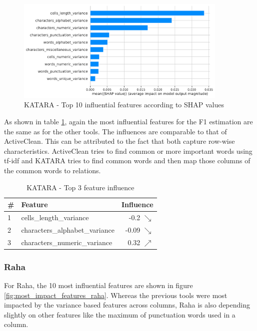 \begin{figure}[H]
    \centering
    \includegraphics[width=0.9\textwidth]{thesis/Figures/RQ4/Shap_KATARA.pdf}
    \caption{KATARA - Top 10 influential features according to SHAP values}
    \label{fig:most_impact_features_katara}
\end{figure}

As shown in table \ref{tab:top_influence_features_KATARA}, again the most influential features for the F1 estimation are the same as for the other tools. The influences are comparable to that of ActiveClean. This can be attributed to the fact that both capture row-wise characteristics. ActiveClean tries to find common or more important words using tf-idf and KATARA tries to find common words and then map those columns of the common words to relations. 

\begin{table}[H]
\centering
\begin{tabular}{llr}
\toprule
 \# &                         Feature &         Influence \\
\midrule
 1 &         cells\_length\_variance &   -0.2 $\searrow$ \\
 2 &  characters\_alphabet\_variance &  -0.09 $\searrow$ \\
 3 &   characters\_numeric\_variance &   0.32 $\nearrow$ \\
\bottomrule
\end{tabular}
\caption{KATARA - Top 3 feature influence}
\label{tab:top_influence_features_KATARA}
\end{table}


\subsubsection{Raha}
For Raha, the 10 most influential features are shown in figure \ref{fig:most_impact_features_raha}. Whereas the previous tools were most impacted by the variance based features across columns, Raha is also depending slightly on other features like the maximum of punctuation words used in a column.

